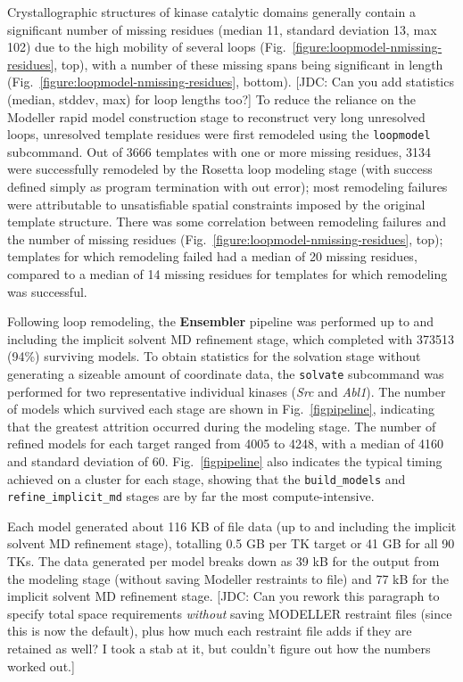 \documentclass[aps,pre,twocolumn,nofootinbib,superscriptaddress,linenumbers]{revtex4-1}
\begin{document}
Crystallographic structures of kinase catalytic domains generally contain a significant number of missing residues (median 11, standard deviation 13, max 102) due to the high mobility of several loops (Fig.~\ref{figure:loopmodel-nmissing-residues}, top), with a number of these missing spans being significant in length (Fig.~\ref{figure:loopmodel-nmissing-residues}, bottom).
{\color{red}[JDC: Can you add statistics (median, stddev, max) for loop lengths too?]}
To reduce the reliance on the Modeller rapid model construction stage to reconstruct very long unresolved loops, unresolved template residues were first remodeled using the {\tt loopmodel} subcommand.
Out of \num{3666} templates with one or more missing residues, \num{3134} were successfully remodeled by the Rosetta loop modeling stage (with success defined simply as program termination with out error); most remodeling failures were attributable to unsatisfiable spatial constraints imposed by the original template structure.
There was some correlation between remodeling failures and the number of missing residues (Fig.~\ref{figure:loopmodel-nmissing-residues}, top); templates for which remodeling failed had a median of 20 missing residues, compared to a median of 14 missing residues for templates for which remodeling was successful.

Following loop remodeling, the {\bf Ensembler} pipeline was performed up to and including the implicit solvent MD refinement stage, which completed with \num{373513} (94\%) surviving models.
To obtain statistics for the solvation stage without generating a sizeable amount of coordinate data, the {\tt solvate} subcommand was performed for two representative individual kinases (\emph{Src} and \emph{Abl1}).
The number of models which survived each stage are shown in Fig.~\ref{figpipeline}, indicating that the greatest attrition occurred during the modeling stage.
The number of refined models for each target ranged from 4005 to 4248, with a median of 4160 and standard deviation of 60.
Fig.~\ref{figpipeline} also indicates the typical timing achieved on a cluster for each stage, showing that the {\tt build\_models} and {\tt refine\_implicit\_md} stages are by far the most compute-intensive.

Each model generated about 116 KB of file data (up to and including the implicit solvent MD refinement stage), totalling 0.5 GB per TK target or 41 GB for all 90 TKs.
The data generated per model breaks down as 39 kB for the output from the modeling stage (without saving Modeller restraints to file) and 77 kB for the implicit solvent MD refinement stage.
{\color{red}[JDC: Can you rework this paragraph to specify total space requirements \emph{without} saving MODELLER restraint files (since this is now the default), plus how much each restraint file adds if they are retained as well?  I took a stab at it, but couldn't figure out how the numbers worked out.]}
\end{document}
